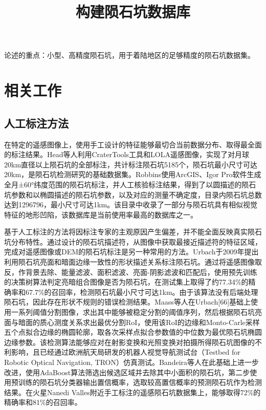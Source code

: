 \documentclass{article}
\begin{document}
\title{构建陨石坑数据库}
论述的重点：小型、高精度陨石坑，用于着陆地区的足够精度的陨石坑数据集。
\section{相关工作}
\subsection{人工标注方法}
在特定的遥感图像上，使用手工设计的特征能够最切合当前数据分布、取得最全面的标注结果。Head\cite{headGlobalDistributionLarge2010}等人利用CraterTools\cite{kneisslMapprojectionindependentCraterSizefrequency2011}工具和LOLA遥感图像，实现了对月球20km直径以上陨石坑的全部标注，共计标注陨石坑5185个，陨石坑最小尺寸可达20km，是陨石坑检测研究的基础数据集。Robbins\cite{robbinsNewGlobalDatabase2019}使用ArcGIS、Igor Pro软件生成全月±60°纬度范围的陨石坑标注，并人工核验标注结果，得到了以圆描述的陨石坑参数和以椭圆描述的陨石坑参数，以及对应的测量不确定度，目录内陨石坑总数达到1296796，最小尺寸可达1km。该目录中收录了一部分与陨石坑具有相似视觉特征的地形凹陷，该数据库是当前使用率最高的数据库之一。\par
基于人工标注的方法将因标注专家的主观原因产生偏差，并不能全面反映真实陨石坑分布特性。通过设计的陨石坑描述符，从图像中获取最接近描述符的特征区域，完成对遥感图像或DEM的陨石坑标注是另一种常用的方法。Urbach\cite{urbachAutomaticDetectionSubkm2009}于2009年提出利用陨石坑亮面和暗面边缘一致性的形状描述关系标注陨石坑。通过将遥感图像取反，作背景去除、能量滤波、面积滤波、亮面-阴影滤波和匹配后，使用预先训练的决策树算法判定亮暗组合图像是否为陨石坑，在测试集上取得了约77.34\%的精确率和67.7\%的召回率，检测陨石坑最小尺寸可达1km。由于该算法没有后端处理陨石坑，因此存在形状不规则的错误检测结果。Maass\cite{maassEdgefreeScalePose2011,maassRobustApproximationImage2016}等人在Urbach[66]基础上使用一系列阈值分割图像，求出其中能够被稳定分割的阈值序列，然后根据陨石坑亮面与暗面的质心测度关系求出最优分割RoI，使用该RoI的边缘和Monto-Carle采样五个点拟合边缘的椭圆轮廓，取各次采样点拟合参数值的中位数为最优陨石坑椭圆边缘参数。该检测算法能够应对在射影变换和光照变换对拍摄所得陨石坑图像的不利影响，且已经通过欧洲航天局研发的机器人视觉导航测试台（Testbed for Robotic Optical Navigation, TRON）仿真测试。Bandeira\cite{bandeiraDetectionSubkilometerCraters2012}等人在此基础上进一步改进，使用AdaBoost算法筛选出候选区域并去除其中小面积的陨石坑，第二步使用预训练的陨石坑分类器输出置信概率，选取较高置信概率的预测陨石坑作为检测结果。在火星Nanedi Valles附近手工标注的遥感陨石坑数据集上，能够取得72\%的精确率和81\%的召回率。
\end{document}
